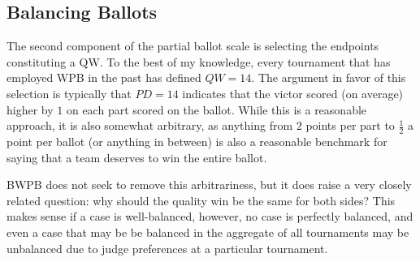 \documentclass{article}
\begin{document}
\subsection{Balancing Ballots}
\label{balancingBallots}
The second component of the partial ballot scale is selecting the endpoints constituting a QW.  To the best of my knowledge, every tournament that has employed WPB in the past has defined $QW=14$.  The argument in favor of this selection is typically that $PD=14$ indicates that the victor scored (on average) higher by $1$ on each part scored on the ballot.  While this is a reasonable approach, it is also somewhat arbitrary, as anything from $2$ points per part to $\frac{1}{2}$ a point per ballot (or anything in between) is also a reasonable benchmark for saying that a team deserves to win the entire ballot.

BWPB does not seek to remove this arbitrariness, but it does raise a very closely related question:  why should the quality win be the same for both sides?  This makes sense if a case is well-balanced, however, no case is perfectly balanced, and even a case that may be be balanced in the aggregate of all tournaments may be unbalanced due to judge preferences at a particular tournament.
\end{document}
